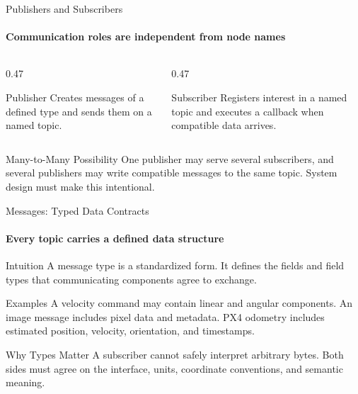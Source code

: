 \begin{frame}{Publishers and Subscribers}
\framesubtitle{Communication roles are independent from node names}
\begin{columns}[T,onlytextwidth]
\begin{column}{0.47\textwidth}
\begin{block}{Publisher}
Creates messages of a defined type and sends them on a named topic.
\end{block}
\end{column}
\hfill
\begin{column}{0.47\textwidth}
\begin{block}{Subscriber}
Registers interest in a named topic and executes a callback when compatible data arrives.
\end{block}
\end{column}
\end{columns}
\begin{exampleblock}{Many-to-Many Possibility}
One publisher may serve several subscribers, and several publishers may write compatible messages to the same topic. System design must make this intentional.
\end{exampleblock}
\end{frame}

\begin{frame}{Messages: Typed Data Contracts}
\framesubtitle{Every topic carries a defined data structure}
\begin{block}{Intuition}
A message type is a standardized form. It defines the fields and field types that communicating components agree to exchange.
\end{block}
\begin{exampleblock}{Examples}
A velocity command may contain linear and angular components. An image message includes pixel data and metadata. PX4 odometry includes estimated position, velocity, orientation, and timestamps.
\end{exampleblock}
\begin{alertblock}{Why Types Matter}
A subscriber cannot safely interpret arbitrary bytes. Both sides must agree on the interface, units, coordinate conventions, and semantic meaning.
\end{alertblock}
\end{frame}

